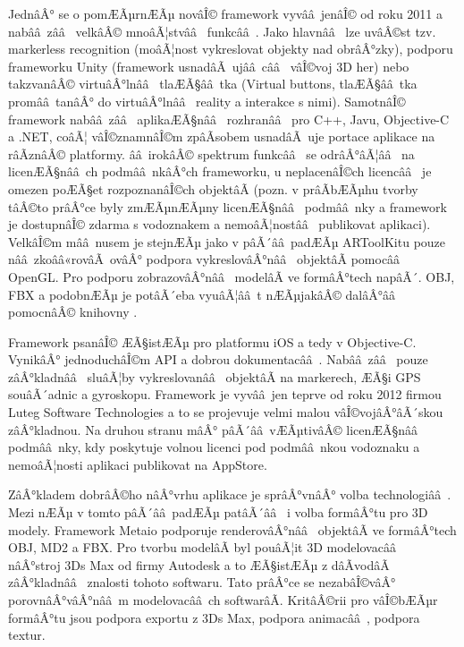 \documentclass[twoside,12pt]{article}
\begin{document}
JednâÂ° se o pomÆÃµrnÆÃµ novâÎ© framework vyvââ jenâÎ© od roku 2011 a nabââ zââ  velkâÂ© mnoâÃ¦stvââ  funkcââ . Jako hlavnââ  lze uvâÂ©st tzv. markerless recognition (moâÃ¦nost vykreslovat objekty nad obrâÂ°zky), podporu frameworku Unity (framework usnadâÃ ujââ cââ  vâÎ©voj 3D her) nebo takzvanâÂ© virtuâÂ°lnââ  tlaÆÃ§ââ tka (Virtual buttons, tlaÆÃ§ââ tka promââ tanâÂ° do virtuâÂ°lnââ  reality a interakce s nimi). SamotnâÎ© framework nabââ zââ  aplikaÆÃ§nââ  rozhranââ  pro C++, Javu, Objective-C a .NET, coâÃ¦ vâÎ©znamnâÎ©m zpâÃsobem usnadâÃ uje portace aplikace na râÃznâÂ© platformy. ââ irokâÂ© spektrum funkcââ  se odrâÂ°âÃ¦ââ  na licenÆÃ§nââ ch podmââ nkâÂ°ch frameworku, u neplacenâÎ©ch licencââ  je omezen poÆÃ§et rozpoznanâÎ©ch objektâÃ (pozn. v prâÃbÆÃµhu tvorby tâÂ©to prâÂ°ce byly zmÆÃµnÆÃµny licenÆÃ§nââ  podmââ nky a framework je dostupnâÎ© zdarma s vodoznakem a nemoâÃ¦nostââ  publikovat aplikaci). VelkâÎ©m mââ nusem je stejnÆÃµ jako v pâÃ´ââ padÆÃµ ARToolKitu pouze nââ zkoââ«rovâÃ ovâÂ° podpora vykreslovâÂ°nââ  objektâÃ pomocââ  OpenGL. Pro podporu zobrazovâÂ°nââ  modelâÃ ve formâÂ°tech napâÃ´. OBJ, FBX a podobnÆÃµ je potâÃ´eba vyuâÃ¦ââ t nÆÃµjakâÂ© dalâÂ°ââ  pomocnâÂ© knihovny \cite{vuforia_3dformats}.

Framework psanâÎ© ÆÃ§istÆÃµ pro platformu iOS a tedy v Objective-C. VynikâÂ° jednoduchâÎ©m API a dobrou dokumentacââ . Nabââ zââ  pouze zâÂ°kladnââ  sluâÃ¦by vykreslovanââ  objektâÃ na markerech, ÆÃ§i GPS souâÃ´adnic a gyroskopu. Framework je vyvââ jen teprve od roku 2012 firmou Luteg Software Technologies a to se projevuje velmi malou vâÎ©vojâÂ°âÃ´skou zâÂ°kladnou. Na druhou stranu mâÂ° pâÃ´ââ vÆÃµtivâÂ© licenÆÃ§nââ  podmââ nky, kdy poskytuje volnou licenci pod podmââ nkou vodoznaku a nemoâÃ¦nosti aplikaci publikovat na AppStore. 


% 
\newpage
{}
ZâÂ°kladem dobrâÂ©ho nâÂ°vrhu aplikace je sprâÂ°vnâÂ° volba technologiââ . Mezi nÆÃµ v tomto pâÃ´ââ padÆÃµ patâÃ´ââ  i volba formâÂ°tu pro 3D modely. Framework Metaio podporuje renderovâÂ°nââ  objektâÃ ve formâÂ°tech OBJ, MD2 a FBX. Pro tvorbu modelâÃ byl pouâÃ¦it 3D modelovacââ  nâÂ°stroj 3Ds Max od firmy Autodesk a to ÆÃ§istÆÃµ z dâÃvodâÃ zâÂ°kladnââ  znalosti tohoto softwaru. Tato prâÂ°ce se nezabâÎ©vâÂ° porovnâÂ°vâÂ°nââ m modelovacââ ch softwarâÃ. KritâÂ©rii pro vâÎ©bÆÃµr formâÂ°tu jsou podpora exportu z 3Ds Max, podpora animacââ , podpora textur.
\end{document}
